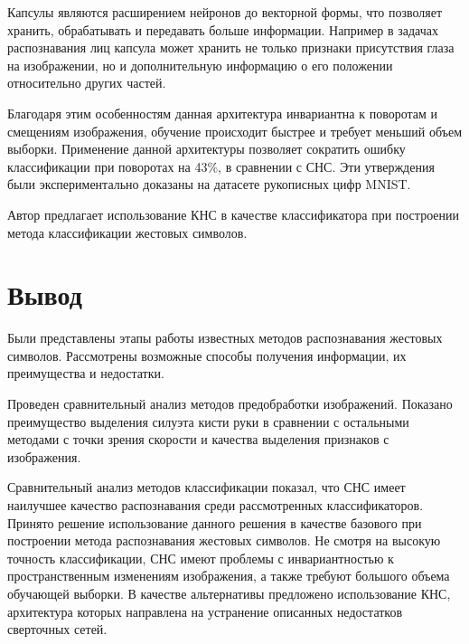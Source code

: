 Капсулы являются расширением нейронов до векторной формы, что позволяет хранить, обрабатывать и передавать больше информации. Например в задачах распознавания лиц капсула может хранить не только признаки присутствия глаза на изображении, но и дополнительную информацию о его положении относительно других частей.

Благодаря этим особенностям данная архитектура инвариантна к поворотам и смещениям изображения, обучение происходит быстрее и требует меньший объем выборки. Применение данной архитектуры позволяет сократить ошибку классификации при поворотах на 43\%, в сравнении с СНС\cite{em}. Эти утверждения были экспериментально доказаны на датасете рукописных цифр MNIST\cite{sabour2017dynamic}.

Автор предлагает использование КНС в качестве классификатора при построении метода классификации жестовых символов.

\section{Вывод}

Были представлены этапы работы известных методов распознавания жестовых символов. Рассмотрены возможные способы получения информации, их преимущества и недостатки. 

Проведен сравнительный анализ методов предобработки изображений. Показано преимущество выделения силуэта кисти руки в сравнении с остальными методами с точки зрения скорости и качества выделения признаков с изображения.

Сравнительный анализ методов классификации показал, что СНС имеет наилучшее качество распознавания среди рассмотренных классификаторов. Принято решение использование данного решения в качестве базового при построении метода распознавания жестовых символов. Не смотря на высокую точность классификации, СНС имеют проблемы с инвариантностью к пространственным изменениям изображения, а также требуют большого объема обучающей выборки. В качестве альтернативы предложено использование КНС, архитектура которых направлена на устранение описанных недостатков сверточных сетей.